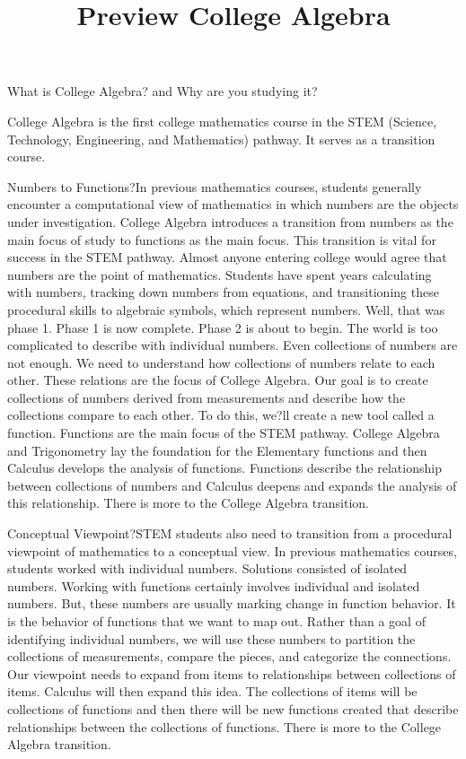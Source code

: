 \documentclass{ximera}
\title{Preview College Algebra}
\begin{document}
\begin{abstract}
\end{abstract}

\maketitle



What is College Algebra?
and
Why are you studying it?

College Algebra is the first college mathematics course in the STEM (Science, Technology, Engineering, and Mathematics) pathway. It serves as a transition course.

Numbers to Functions?In previous mathematics courses, students generally encounter a computational view of mathematics in which numbers are the objects under investigation. College Algebra introduces a transition from numbers as the main focus of study to functions as the main focus. This transition is vital for success in the STEM pathway.
Almost anyone entering college would agree that numbers are the point of mathematics.  Students have spent years calculating with numbers, tracking down numbers from equations, and transitioning these procedural skills to algebraic symbols, which represent numbers. Well, that was phase 1.  Phase 1 is now complete.  Phase 2 is about to begin.
The world is too complicated to describe with individual numbers. Even collections of numbers are not enough. We need to understand how collections of numbers relate to each other. These relations are the focus of College Algebra.
Our goal is to create collections of numbers derived from measurements and describe how the collections compare to each other. To do this, we?ll create a new tool called a function.
Functions are the main focus of the STEM pathway.  College Algebra and Trigonometry lay the foundation for the Elementary functions and then Calculus develops the analysis of functions.  Functions describe the relationship between collections of numbers and Calculus deepens and expands the analysis of this relationship.
There is more to the College Algebra transition.

Conceptual Viewpoint?STEM students also need to transition from a procedural viewpoint of mathematics to a conceptual view. In previous mathematics courses, students worked with individual numbers. Solutions consisted of isolated numbers. Working with functions certainly involves individual and isolated numbers. But, these numbers are usually marking change in function behavior. It is the behavior of functions that we want to map out. Rather than a goal of identifying individual numbers, we will use these numbers to partition the collections of measurements, compare the pieces, and categorize the connections. Our viewpoint needs to expand from items to relationships between collections of items.
Calculus will then expand this idea.  The collections of items will be collections of functions and then there will be new functions created that describe relationships between the collections of functions.
There is more to the College Algebra transition.
\end{document}

